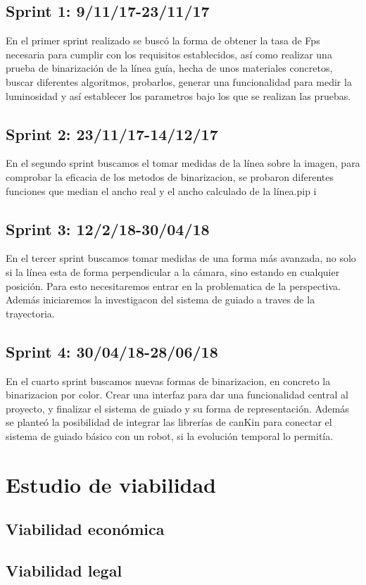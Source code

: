 \subsection{Sprint 1: 9/11/17-23/11/17}
En el primer sprint realizado se buscó la forma de obtener la tasa de Fps necesaria para cumplir con los requisitos establecidos, así como realizar una prueba de binarización de la línea guía, hecha de unos materiales concretos, buscar diferentes algoritmos, probarlos, generar una funcionalidad para medir la luminosidad y así establecer los parametros bajo los que se realizan las pruebas.

\subsection{Sprint 2: 23/11/17-14/12/17}
En el segundo sprint buscamos el tomar medidas de la línea sobre la imagen, para comprobar la eficacia de los metodos de binarizacion, se probaron diferentes funciones que median el ancho real y el ancho calculado de la línea.pip i

\subsection{Sprint 3: 12/2/18-30/04/18}
En el tercer sprint buscamos tomar medidas de una forma más avanzada, no solo si la línea esta de forma perpendicular a la cámara, sino estando en cualquier posición. Para esto necesitaremos entrar en la problematica de la perspectiva. Además iniciaremos la investigacon del sistema de guiado a traves de la trayectoria.

\subsection{Sprint 4: 30/04/18-28/06/18}
En el cuarto sprint buscamos nuevas formas de binarizacion, en concreto la binarizacion por color. Crear una interfaz para dar una funcionalidad central al proyecto, y finalizar el sistema de guiado y su forma de representación. Además se planteó la posibilidad de integrar las librerías de canKin para conectar el sistema de guiado básico con un robot, si la evolución temporal lo permitía.

\section{Estudio de viabilidad}

\subsection{Viabilidad económica}

\subsection{Viabilidad legal}


